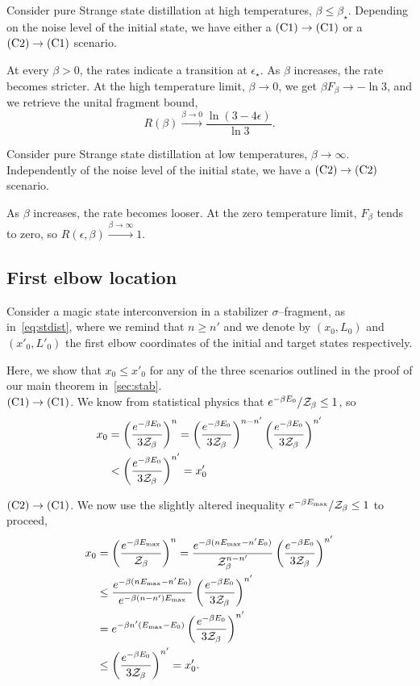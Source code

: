 \documentclass[pra,
aps,
twocolumn,
superscriptaddress,
groupedaddress,
nofootinbib,
reprint
]{revtex4-1}
\begin{document}
Consider pure Strange state distillation at high temperatures, $\beta \leq \beta_{\star}$.
Depending on the noise level of the initial state, we have either a $\rm{(C1)} \rightarrow \rm{(C1)}$ or a $\rm{(C2)} \rightarrow \rm{(C1)}$ scenario.

At every $\beta > 0$, the rates indicate a transition at $\epsilon_{\star}$.
As $\beta$ increases, the rate becomes stricter.
At the high temperature limit, $\beta \rightarrow 0$, we get $\beta F_\beta \rightarrow -\ln{3}$, and we retrieve the unital fragment bound,
\begin{equation}
	R(\beta) \xrightarrow{\beta \rightarrow 0} \frac{\ln{(3-4\epsilon)}}{\ln{3}}.
\end{equation}

Consider pure Strange state distillation at low temperatures, $\beta \rightarrow \infty$.
Independently of the noise level of the initial state, we have a $\rm{(C2)} \rightarrow \rm{(C2)}$ scenario.

As $\beta$ increases, the rate becomes looser.
At the zero temperature limit, $F_\beta$ tends to zero, so $R(\epsilon, \beta) \xrightarrow{\beta \rightarrow \infty} 1$.

\subsection{First elbow location}
\label{app:first_elb_loc}
Consider a magic state interconversion in a stabilizer $\sigma$--fragment, as in~\cref{eq:stdist}, where we remind that $n \geq n'$ and we denote by $(x_0, L_0)$ and $(x'_0, L'_0)$ the first elbow coordinates of the initial and target states respectively.

Here, we show that $x_0 \leq x'_0$ for any of the three scenarios outlined in the proof of our main theorem in~\cref{sec:stab}.\\

$\rm{(C1)} \rightarrow \rm{(C1)}$.
We know from statistical physics that $e^{-\beta E_0} / \mathcal{Z}_\beta \leq 1$, so
	\begin{align*}
		x_0 &= \left(\dfrac{e^{-\beta E_0}}{3\mathcal{Z}_\beta}\right)^n = \left(\dfrac{e^{-\beta E_0}}{3\mathcal{Z}_\beta}\right)^{n-n'} \left(\dfrac{e^{-\beta E_0}}{3\mathcal{Z}_\beta}\right)^{n'} \\
		&< \left(\dfrac{e^{-\beta E_0}}{3\mathcal{Z}_\beta}\right)^{n'} = x_0'		
	\end{align*}

$\rm{(C2)} \rightarrow \rm{(C1)}$.
We now use the slightly altered inequality $e^{-\beta E_{\rm{max}}} / \mathcal{Z}_\beta \leq 1$ to proceed,
	\begin{align*}
		x_0 &= \left(\dfrac{e^{-\beta E_{\rm{max}}}}{\mathcal{Z}_\beta}\right)^n = \dfrac{e^{-\beta(n E_{\rm{max}} - n' E_0)}}{\mathcal{Z}_\beta^{n-n'}} \left(\dfrac{e^{-\beta E_0}}{3\mathcal{Z}_\beta}\right)^{n'} \\
		&\leq \dfrac{e^{-\beta(n E_{\rm{max}} - n' E_0)}}{e^{-\beta (n-n') E_{\rm{max}}}} \left(\dfrac{e^{-\beta E_0}}{3\mathcal{Z}_\beta}\right)^{n'} \\
		&= e^{-\beta n' (E_{\rm{max}} - E_0)} \left(\dfrac{e^{-\beta E_0}}{3\mathcal{Z}_\beta}\right)^{n'} \\
		&\leq \left(\dfrac{e^{-\beta E_0}}{3\mathcal{Z}_\beta}\right)^{n'} = x_0'.
	\end{align*}
\end{document}
